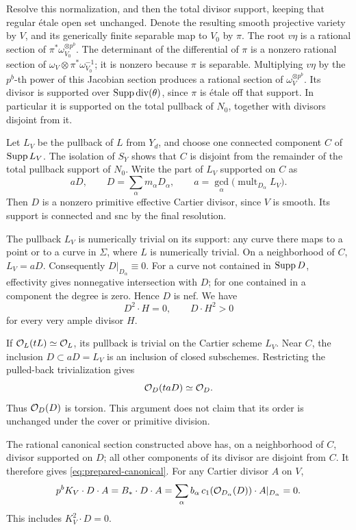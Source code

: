 Resolve this normalization, and then the total divisor support, keeping
that regular étale open set unchanged.  Denote the resulting smooth
projective variety by \(V\), and its generically finite separable map to
\(V_0\) by \(\pi\).
The root \(v\eta\) is a rational section of
\(\pi^*\omega_{V_0}^{\otimes p^b}\).
The determinant of the differential of \(\pi\) is a nonzero rational
section of \(\omega_V\otimes\pi^*\omega_{V_0}^{-1}\);
it is nonzero because \(\pi\) is separable.
Multiplying \(v\eta\) by the \(p^b\)-th power of this Jacobian section produces a rational section
of \(\omega_V^{\otimes p^b}\).
Its divisor is supported over
\(\operatorname{Supp}\operatorname{div}(\theta)\), since \(\pi\) is étale off that
support.  In particular it is supported on the total pullback of \(N_0\),
together with divisors disjoint from it.

Let \(L_V\) be the pullback of \(L\) from \(Y_d\), and choose one connected
component \(C\) of \(\operatorname{Supp} L_V\).
The isolation of \(S_Y\) shows that \(C\) is disjoint from the remainder
of the total pullback support of \(N_0\).
Write the part of \(L_V\) supported on \(C\) as
\[
 aD,\qquad
 D=\sum_\alpha m_\alpha D_\alpha,\qquad
 a=\gcd_\alpha\bigl(\operatorname{mult}_{D_\alpha}L_V\bigr).
\]
Then \(D\) is a nonzero primitive effective Cartier divisor, since \(V\)
is smooth.  Its support is connected and snc by the final resolution.

The pullback \(L_V\) is numerically trivial on its support:
any curve there maps to a point or to a curve in \(\Sigma\), where
\(L\) is numerically trivial.  On a neighborhood of \(C\), \(L_V=aD\).
Consequently \(D|_{D_\alpha}\equiv0\).
For a curve not contained in \(\operatorname{Supp} D\), effectivity gives nonnegative
intersection with \(D\); for one contained in a component the degree is
zero.  Hence \(D\) is nef.  We have
\[
 D^2\cdot H=0,\qquad D\cdot H^2>0
\]
for every very ample divisor \(H\).

If \(\mathcal O_L(tL)\simeq\mathcal O_L\), its pullback is trivial on the Cartier
scheme \(L_V\).  Near \(C\), the inclusion \(D\subset aD=L_V\) is an
inclusion of closed subschemes.  Restricting the pulled-back
trivialization gives
\[
 \mathcal O_D(taD)\simeq\mathcal O_D.
\]
Thus \(\mathcal O_D(D)\) is torsion.  This argument does not claim that its
order is unchanged under the cover or primitive division.

The rational canonical section constructed above has, on a neighborhood
of \(C\), divisor supported on \(D\); all other components of its divisor
are disjoint from \(C\).  It therefore gives
\eqref{eq:prepared-canonical}.  For any Cartier divisor \(A\) on \(V\),
\[
 p^bK_V\cdot D\cdot A
   =B_*\cdot D\cdot A
   =\sum_\alpha b_\alpha\,
       c_1(\mathcal O_{D_\alpha}(D))\cdot A|_{D_\alpha}=0.
\]
This includes \(K_V^2\cdot D=0\).

